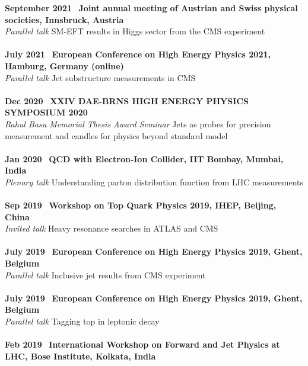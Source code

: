 \documentclass[a4paper,11pt]{article}
\begin{document}
{\textbf{September 2021} \ \textbf{Joint annual meeting of Austrian and Swiss physical societies, Innsbruck, Austria} \\
\textit{Parallel talk}\hspace{0.5cm}
SM-EFT results in Higgs sector from the CMS experiment\\
\\
\textbf{July 2021} \ \textbf{European Conference on High Energy Physics 2021, Hamburg, Germany (online)} \\
\textit{Parallel talk}\hspace{0.5cm}
Jet substructure measurements in CMS\\
\\
\textbf{Dec 2020} \ \textbf{XXIV DAE-BRNS HIGH ENERGY PHYSICS SYMPOSIUM 2020} \\
\textit{Rahul Basu Memorial Thesis Award Seminar}\hspace{0.5cm}
Jets as probes for precision measurement and candles for physics beyond standard model\\
\\
\textbf{Jan 2020} \ \textbf{QCD with Electron-Ion Collider, IIT Bombay, Mumbai, India} \\
\textit{Plenary talk}\hspace{0.5cm}
Understanding parton distribution function from LHC measurements\\
\\
\textbf{Sep 2019} \ \textbf{Workshop on Top Quark Physics 2019, IHEP, Beijing, China} \\
\textit{Invited talk}\hspace{0.5cm} 
Heavy resonance searches in ATLAS and CMS \\
\\
\textbf{July 2019} \ \textbf{European Conference on High Energy Physics 2019, Ghent, Belgium} \\
\textit{Parallel talk}\hspace{0.5cm} 
Inclusive jet results from CMS experiment  \\
\\
\textbf{July 2019} \ \textbf{European Conference on High Energy Physics 2019, Ghent, Belgium} \\
\textit{Parallel talk}\hspace{0.5cm}
Tagging top in leptonic decay \\
\\
\textbf{Feb 2019} \ \textbf{International Workshop on Forward and Jet Physics at LHC, Bose Institute, Kolkata, India} \\
}
\end{document}
